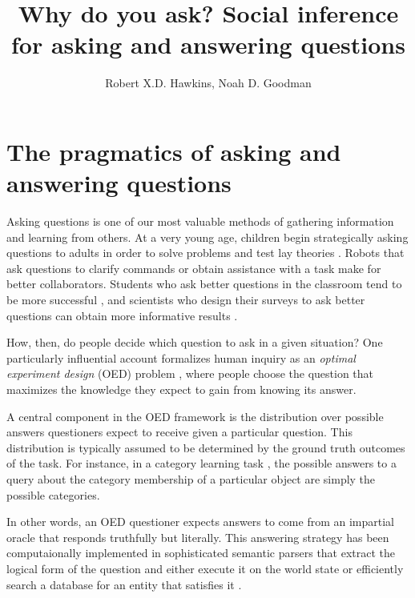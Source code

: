 \documentclass[12pt, floatsintext, jou]{apa6}
\title{Why do you ask? Social inference for asking and answering questions}
\author{Robert X.D. Hawkins, Noah D. Goodman}
\affiliation{Stanford University}
\begin{document}
\maketitle
\section{The pragmatics of asking and answering questions}

Asking questions is one of our most valuable methods of gathering information and learning from others. 
At a very young age, children begin strategically asking questions to adults in order to solve problems and test lay theories \cite{LegareEtAl13_QuestionsChildhood, Chouinard07_ChildrenQuestions,CallananOakes92_PreschoolerQuestions}. 
Robots that ask questions to clarify commands \cite{DeitsTellex___Roy13_HumanRobotDialog} or obtain assistance with a task \cite{FongThorpeBaur03_RobotQuestions} make for better collaborators. 
Students who ask better questions in the classroom tend to be more successful \cite{GraesserPerson94_QuestionAskingTutoring}, and scientists who design their surveys to ask better questions can obtain more informative results \cite{ClarkSchober92_InfluencingAnswers}.

How, then, do people decide which question to ask in a given situation?
One particularly influential account formalizes human inquiry as an \emph{optimal experiment design} (OED) problem \cite{OaksfordChater94_RationalAnalysisSelectionTask,Nelson05_UsefulQuestions,MyungPitt09_OED, GureckisMarkant12_SelfDirectedLearning}, where people choose the question that maximizes the knowledge they expect to gain from knowing its answer. 

A central component in the OED framework is the distribution over possible answers questioners expect to receive given a particular question.
This distribution is typically assumed to be determined by the ground truth outcomes of the task. 
For instance, in a category learning task \cite{MarkantGureckis14_ActiveLearning}, the possible answers to a query about the category membership of a particular object are simply the possible categories.

In other words, an OED questioner expects answers to come from an impartial oracle that responds truthfully but literally.
This answering strategy has been computaionally implemented in sophisticated semantic parsers that extract the logical form of the question and either execute it on the world state \cite{rothe2017question} or efficiently search a database for an entity that satisfies it \cite{BerantChouFrostigLiang13_FreebaseQAPairs}. 
\end{document}
